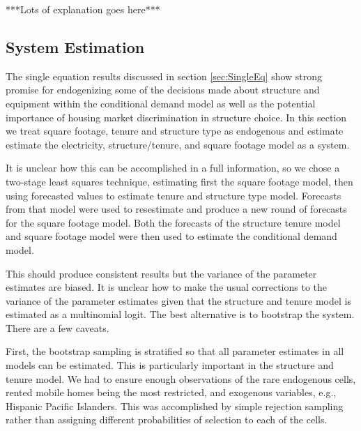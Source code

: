 \documentclass{article}
\begin{document}
% 
% 
% 

***Lots of explanation goes here***




  \subsection{System Estimation}

The single equation results discussed in section \ref{sec:SingleEq} show strong promise for endogenizing some of the decisions made about structure and equipment within the conditional demand model as well as the potential importance of housing market discrimination in structure choice.  In this section we treat square footage, tenure and structure type as endogenous and estimate estimate the electricity, structure/tenure, and square footage model as a system.

It is unclear how this can be accomplished in a full information, so we chose a two-stage least squares technique, estimating first the square footage model, then using forecasted values to estimate tenure and structure type model.  Forecasts from that model were used to resestimate and produce a new round of forecasts for the square footage model.  Both the forecasts of the structure tenure model and square footage model were then used to estimate the conditional demand model.

This should produce consistent results but the variance of the parameter estimates are biased.  It is unclear how to make the usual corrections to the variance of the parameter estimates given that the structure and tenure model is estimated as a multinomial logit.  The best alternative is to bootstrap the system.  There are a few caveats.

First, the bootstrap sampling is stratified so that all parameter estimates in all models can be estimated.  This is particularly important in the structure and tenure model.  We had to ensure enough observations of the rare endogenous cells, rented mobile homes being the most restricted, and exogenous variables, e.g., Hispanic Pacific Islanders.  This was accomplished by simple rejection sampling rather than assigning different probabilities of selection to each of the cells.
\end{document}
